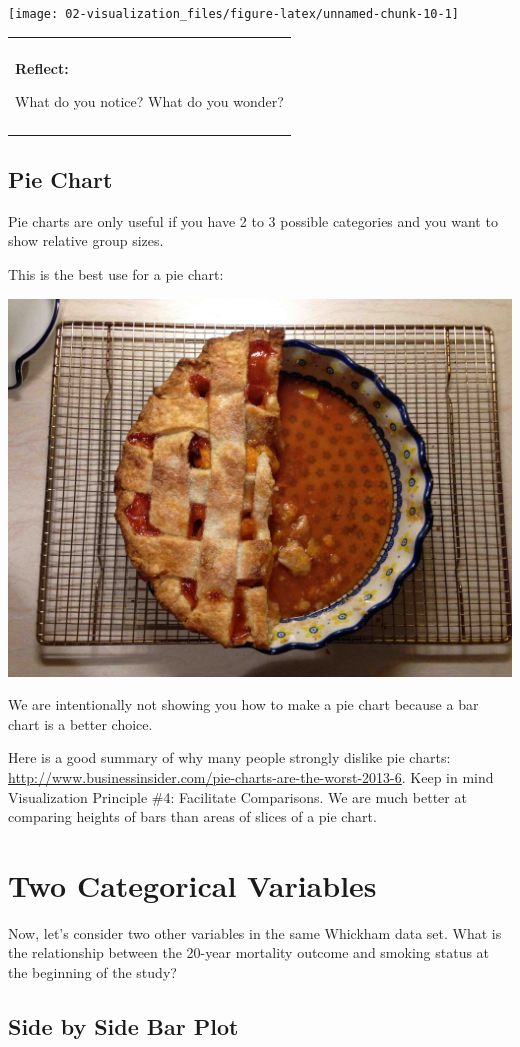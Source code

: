 \documentclass[
]{book}
\newenvironment{reflect}
{
    \begin{center}
    
    \begin{tabular}{|p{0.8\textwidth}|}
    \rowcolor{LightBlue}
    \hline\\
    \rowcolor{LightBlue}
    \textbf{Reflect:}
}
{
    \\\rowcolor{LightBlue}
    \\\hline
    \end{tabular} 
    \end{center}
}
\begin{document}
\begin{center}\texttt{[image: 02-visualization\_files/figure-latex/unnamed-chunk-10-1]} \end{center}

\begin{reflect}
What do you notice? What do you wonder?
\end{reflect}

\subsection{Pie Chart}\label{pie-chart}

Pie charts are only useful if you have 2 to 3 possible categories and you want to show relative group sizes.

This is the best use for a pie chart:

\begin{center}\includegraphics[width=.5\textwidth]{Photos/pie} \end{center}

We are intentionally not showing you how to make a pie chart because a bar chart is a better choice.

Here is a good summary of why many people strongly dislike pie charts: \url{http://www.businessinsider.com/pie-charts-are-the-worst-2013-6}. Keep in mind Visualization Principle \#4: Facilitate Comparisons. We are much better at comparing heights of bars than areas of slices of a pie chart.

\section{Two Categorical Variables}\label{two-categorical-variables}

Now, let's consider two other variables in the same Whickham data set. What is the relationship between the 20-year mortality outcome and smoking status at the beginning of the study?

\subsection{Side by Side Bar Plot}\label{side-by-side-bar-plot}
\end{document}
